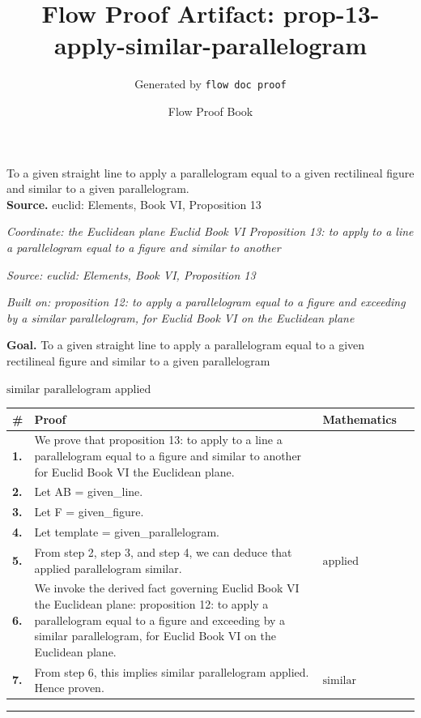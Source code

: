 \documentclass[11pt]{article}
\title{Flow Proof Artifact: prop-13-apply-similar-parallelogram}
\author{Generated by \texttt{flow doc proof}}
\date{Flow Proof Book}
\theoremstyle{definition}
\begin{document}
\maketitle
To a given straight line to apply a parallelogram equal to a given rectilineal figure and similar to a given parallelogram.\\[0.5em]
\textbf{Source.} euclid: Elements, Book VI, Proposition 13\\[0.5em]
\bigskip
{}\par
\smallskip\noindent\textit{Coordinate: the Euclidean plane \cdot Euclid Book VI \cdot Proposition 13: to apply to a line a parallelogram equal to a figure and similar to another}\par
\smallskip\noindent\textit{Source: euclid: Elements, Book VI, Proposition 13}\par
\smallskip\noindent\textit{Built on: proposition 12: to apply a parallelogram equal to a figure and exceeding by a similar parallelogram, for Euclid Book VI on the Euclidean plane}\par
\medskip
\noindent\textbf{Goal.} To a given straight line to apply a parallelogram equal to a given rectilineal figure and similar to a given parallelogram\par
\noindent$\displaystyle \text{similar parallelogram applied}$\par
\medskip
\noindent
\begin{tabular}{@{} >{\raggedright\arraybackslash}p{} >{\raggedright\arraybackslash}p{} >{\raggedleft\arraybackslash}p{} @{}}
\textbf{\#} & \textbf{Proof} & \textbf{Mathematics} \\
\midrule
\textbf{1.} & We prove that proposition 13: to apply to a line a parallelogram equal to a figure and similar to another for Euclid Book VI the Euclidean plane. & \\[0.45em]
\textbf{2.} & Let AB = given\_line. & \\[0.45em]
\textbf{3.} & Let F = given\_figure. & \\[0.45em]
\textbf{4.} & Let template = given\_parallelogram. & \\[0.45em]
\textbf{5.} & From step 2, step 3, and step 4, we can deduce that applied parallelogram similar. & $\displaystyle \text{applied parallelogram similar}$ \\[0.45em]
\textbf{6.} & We invoke the derived fact governing Euclid Book VI the Euclidean plane: proposition 12: to apply a parallelogram equal to a figure and exceeding by a similar parallelogram, for Euclid Book VI on the Euclidean plane. & \\[0.45em]
\textbf{7.} & From step 6, this implies similar parallelogram applied. Hence proven. & $\displaystyle \text{similar parallelogram applied}$ \\[0.45em]
\bottomrule
\end{tabular}
\label{thm:Geometry-Euclid Book VI-proposition_13_to_apply_to_a_line_a_parallelogram_equal_to_a_figure_and_similar_to_another}
\par\medskip\hrule
\end{document}
